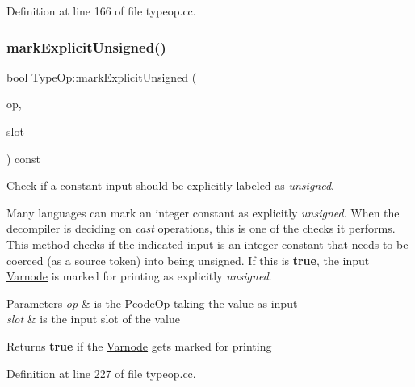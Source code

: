 Definition at line 166 of file typeop.\+cc.

\mbox{\label{class_type_op_a490abb4596b7ddc78c5afc40a6326701}} 
\subsubsection{\texorpdfstring{markExplicitUnsigned()}{markExplicitUnsigned()}}
{\footnotesize\ttfamily bool Type\+Op\+::mark\+Explicit\+Unsigned (\begin{DoxyParamCaption}\item[{\mbox{\hyperlink{class_pcode_op}{Pcode\+Op}} $\ast$}]{op,  }\item[{int4}]{slot }\end{DoxyParamCaption}) const}



Check if a constant input should be explicitly labeled as {\itshape unsigned}. 

Many languages can mark an integer constant as explicitly {\itshape unsigned}. When the decompiler is deciding on {\itshape cast} operations, this is one of the checks it performs. This method checks if the indicated input is an integer constant that needs to be coerced (as a source token) into being unsigned. If this is {\bfseries{true}}, the input \mbox{\hyperlink{class_varnode}{Varnode}} is marked for printing as explicitly {\itshape unsigned}. 
\begin{DoxyParams}{Parameters}
{\em op} & is the \mbox{\hyperlink{class_pcode_op}{Pcode\+Op}} taking the value as input \\
\hline
{\em slot} & is the input slot of the value \\
\hline
\end{DoxyParams}
\begin{DoxyReturn}{Returns}
{\bfseries{true}} if the \mbox{\hyperlink{class_varnode}{Varnode}} gets marked for printing 
\end{DoxyReturn}


Definition at line 227 of file typeop.\+cc.

